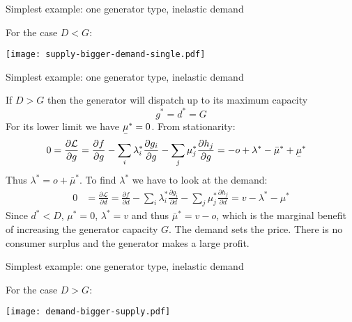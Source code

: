 \documentclass[10pt,aspectratio=169,dvipsnames]{beamer}
\def\l{\lambda}
\def\m{\mu}
\def\d{\partial}
\def\cL{\mathcal{L}}
\newcommand{\ubar}[1]{\text{\b{$#1$}}}
\begin{document}
\begin{frame}{Simplest example: one generator type, inelastic demand}

  For the case $D < G$:

  \texttt{[image: supply-bigger-demand-single.pdf]}

\end{frame}

\begin{frame}{Simplest example: one generator type, inelastic demand}

  If $D > G$ then the generator will dispatch up to its maximum capacity
  \begin{equation*}
    g^* = d^* = G
  \end{equation*}
  For its lower limit we have $\ubar{\m}^* = 0$. From stationarity:
  \begin{align*}
    0 & = \frac{\d \cL}{\d g } =   \frac{\d f}{\d g} - \sum_i \l_i^* \frac{\d g_i}{\d g}  - \sum_j \m_j^* \frac{\d h_j}{\d g} = - o + \l^* - \bar{\m}^* + \ubar{\m}^*
  \end{align*}
  Thus $\l^* = o + \bar{\m}^*$. To find $\l^*$ we have to look at the demand:
    \begin{align*}
      0 & = \frac{\d \cL}{\d d} =   \frac{\d f}{\d d} - \sum_i \l_i^* \frac{\d g_i}{\d d}  - \sum_j \m_j^* \frac{\d h_j}{\d d} = v - \l^* - \m^*
    \end{align*}
  Since $d^* < D$, $\m^* = 0$, $\l^* = v$ and thus $\bar{\m}^* = v-o$, which is the marginal benefit of increasing the generator capacity $G$. The \alert{demand sets the price}. There is no consumer surplus and the generator makes a large profit.

\end{frame}


\begin{frame}{Simplest example: one generator type, inelastic demand}

  For the case $D > G$:

  \texttt{[image: demand-bigger-supply.pdf]}

\end{frame}
\end{document}
